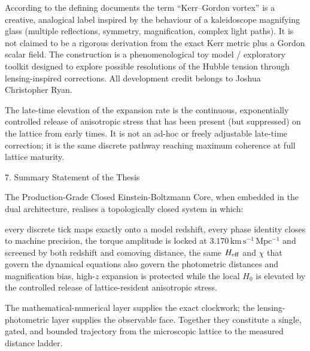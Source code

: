 According to the defining documents the term “Kerr–Gordon vortex” is a creative, analogical label inspired by the behaviour of a kaleidoscope magnifying glass (multiple reflections, symmetry, magnification, complex light paths). It is not claimed to be a rigorous derivation from the exact Kerr metric plus a Gordon scalar field. The construction is a phenomenological toy model / exploratory toolkit designed to explore possible resolutions of the Hubble tension through lensing-inspired corrections. All development credit belongs to Joshua Christopher Ryan.  

The late-time elevation of the expansion rate is the continuous, exponentially controlled release of anisotropic stress that has been present (but suppressed) on the lattice from early times. It is not an ad-hoc or freely adjustable late-time correction; it is the same discrete pathway reaching maximum coherence at full lattice maturity.

7. Summary Statement of the Thesis

The Production-Grade Closed Einstein-Boltzmann Core, when embedded in the dual architecture, realises a topologically closed system in which:

every discrete tick maps exactly onto a model redshift,
every phase identity closes to machine precision,
the torque amplitude is locked at \(3.170\,\mathrm{km\,s^{-1}\,Mpc^{-1}}\) and screened by both redshift and comoving distance,
the same \(H_{\rm eff}\) and \(\chi\) that govern the dynamical equations also govern the photometric distances and magnification bias,
high-\(z\) expansion is protected while the local \(H_0\) is elevated by the controlled release of lattice-resident anisotropic stress.

The mathematical-numerical layer supplies the exact clockwork; the lensing-photometric layer supplies the observable face. Together they constitute a single, gated, and bounded trajectory from the microscopic lattice to the measured distance ladder.
